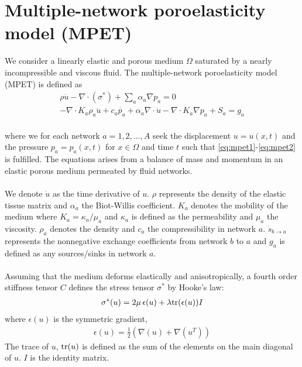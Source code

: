 \section{Multiple-network poroelasticity model (MPET)} 
\label{section:mpet}
We consider a linearly elastic and porous medium $\Omega$ saturated by a nearly incompressible and viscous  fluid. The multiple-network poroelasticity model (MPET) is defined as
\\
\begin{align} \label{eq:mpet1}
\rho \ddot{u} - \nabla \cdot (\sigma^{\ast}) + \displaystyle\sum_a \alpha_a \nabla p_a = 0  \\ 
- \nabla \cdot K_a \rho_a  \ddot{u} +  c_a\dot{p_a} + \alpha_a \nabla \cdot\dot{u} - \nabla \cdot K_a \nabla p_a + S_a = g_a  \label{eq:mpet2}
\end{align}
\\
where we for each network $a=1,2,\dots, A$ seek the displacement $u = u(x,t)$ and the pressure $p_a = p_a(x,t)$ for $x \in \Omega$ and time $t$ such that \eqref{eq:mpet1}-\eqref{eq:mpet2} is fulfilled. The equations arises from a balance of mass and momentum in an elastic porous medium permeated by fluid networks.
\\
\\
We denote $\dot{u}$ as the time derivative of $u$. $\rho$ represents the density of the elastic tissue matrix and $\alpha_a$ the Biot-Willis coefficient. $K_a$ denotes the mobility of the medium where $K_a = \kappa_a/\mu_a$ and $\kappa_a$ is defined as the permeability and $\mu_a$ the viscosity. $\rho_a$ denotes the density and $c_a$ the compressibility in network $a$. $\dot{s}_{b \rightarrow a} $ represents the nonnegative exchange coefficients from network $b$ to $a$ and $g_a$ is defined as any sources/sinks in network $a$. 
\\
\\
Assuming that the medium deforms elastically and anisotropically, a fourth order stiffness tensor $C$ defines the stress tensor $\sigma^*$ by Hooke's law:
\begin{align}
\sigma^*(u) = 2\mu \, \epsilon(u) + \lambda \textnormal{tr}(\epsilon(u)) I
\end{align}
where $\epsilon(u)$ is the symmetric gradient, 
\begin{align}
\epsilon(u) = \frac{1}{2}\left( \nabla(u) + \nabla(u^T)\right)
\end{align}
The trace of $u$, $\textnormal{tr}(u)$ is defined as the sum of the elements on the main diagonal of $u$. $I$ is the identity matrix. 
